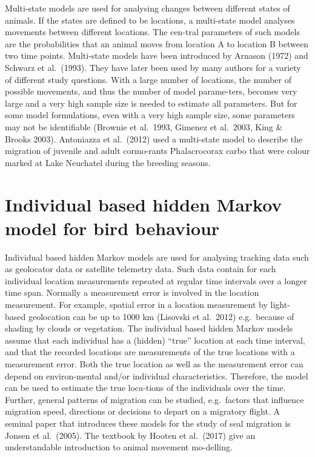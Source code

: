 \documentclass[
]{book}
\begin{document}
Multi-state models are used for analysing changes between different states of animals. If the states are defined to be locations, a multi-state model analyses movements between different locations. The cen-tral parameters of such models are the probabilities that an animal moves from location A to location B between two time points. Multi-state models have been introduced by Arnason (1972) and Schwarz et al.~(1993). They have later been used by many authors for a variety of different study questions. With a large number of locations, the number of possible movements, and thus the number of model parame-ters, becomes very large and a very high sample size is needed to estimate all parameters. But for some model formulations, even with a very high sample size, some parameters may not be identifiable (Brownie et al.~1993, Gimenez et al.~2003, King \& Brooks 2003).
Antoniazza et al.~(2012) used a multi-state model to describe the migration of juvenile and adult cormo-rants Phalacrocorax carbo that were colour marked at Lake Neuchatel during the breeding seasons.

\hypertarget{individual-based-hidden-markov-model-for-bird-behaviour}{%
\section{Individual based hidden Markov model for bird behaviour}\label{individual-based-hidden-markov-model-for-bird-behaviour}}

Individual based hidden Markov models are used for analysing tracking data such as geolocator data or satellite telemetry data. Such data contain for each individual location measurements repeated at regular time intervals over a longer time span. Normally a measurement error is involved in the location measurement. For example, spatial error in a location measurement by light-based geolocation can be up to 1000 km (Lisovski et al.~2012) e.g.~because of shading by clouds or vegetation.
The individual based hidden Markov models assume that each individual has a (hidden) ``true'' location at each time interval, and that the recorded locations are measurements of the true locations with a measurement error. Both the true location as well as the measurement error can depend on environ-mental and/or individual characteristics. Therefore, the model can be used to estimate the true loca-tions of the individuals over the time. Further, general patterns of migration can be studied, e.g.~factors that influence migration speed, directions or decisions to depart on a migratory flight.
A seminal paper that introduces these models for the study of seal migration is Jonsen et al.~(2005). The textbook by Hooten et al.~(2017) give an understandable introduction to animal movement mo-delling.
\end{document}
